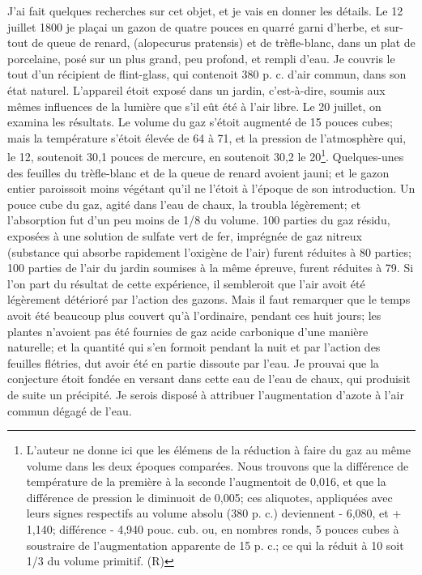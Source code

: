 J'ai fait quelques recherches sur cet objet, et je vais en donner les détails. Le 12 juillet 1800 je plaçai un gazon de quatre pouces en quarré garni d'herbe, et sur-tout de queue de renard, (alopecurus pratensis) et de trèfle-blanc, dans un plat de porcelaine, posé sur un plus grand, peu profond, et rempli d'eau. Je couvris le tout d'un récipient de flint-glass, qui contenoit 380 p. c. d'air commun, dans son état naturel. L'appareil étoit exposé dans un jardin, c'est-à-dire, soumis aux mêmes influences de la lumière que s'il eût été à l'air libre. Le 20 juillet, on examina les résultats. Le volume du gaz s'étoit augmenté de 15 pouces cubes; mais la température s'étoit élevée de 64 à 71, et la pression de l'atmosphère qui, le 12, soutenoit 30,1 pouces de mercure, en soutenoit 30,2 le 20\footnote{L'auteur ne donne ici que les élémens de la réduction à faire du gaz au même volume dans les deux époques comparées. Nous trouvons que la différence de température de la première à la seconde l'augmentoit de 0,016, et que la différence de pression le diminuoit de 0,005; ces aliquotes, appliquées avec leurs signes respectifs au volume absolu (380 p. c.) deviennent - 6,080, et + 1,140; différence - 4,940 pouc. cub. ou, en nombres ronds, 5 pouces cubes à soustraire de l'augmentation apparente de 15 p. c.; ce qui la réduit à 10 soit 1/3 du volume primitif. (R)}. Quelques-unes\setcounter{page}{28} des feuilles du trèfle-blanc et de la queue de renard avoient jauni; et le gazon entier paroissoit moins végétant qu'il ne l'étoit à l'époque de son introduction. Un pouce cube du gaz, agité dans l'eau de chaux, la troubla légèrement; et l'absorption fut d'un peu moins de 1/8 du volume. 100 parties du gaz résidu, exposées à une solution de sulfate vert de fer, imprégnée de gaz nitreux (substance qui absorbe rapidement l'oxigène de l'air) furent réduites à 80 parties; 100 parties de l'air du jardin soumises à la même épreuve, furent réduites à 79. Si l'on part du résultat de cette expérience, il sembleroit que l'air avoit été légèrement détérioré par l'action des gazons. Mais il faut remarquer que le temps avoit été beaucoup plus couvert qu'à l'ordinaire, pendant ces huit jours; les plantes n'avoient pas été fournies de gaz acide carbonique d'une manière naturelle; et la quantité qui\setcounter{page}{29} s'en formoit pendant la nuit et par l'action des feuilles flétries, dut avoir été en partie dissoute par l'eau. Je prouvai que la conjecture étoit fondée en versant dans cette eau de l'eau de chaux, qui produisit de suite un précipité. Je serois disposé à attribuer l'augmentation d'azote à l'air commun dégagé de l'eau.
